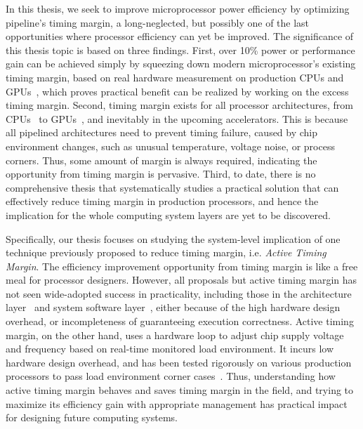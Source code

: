 In this thesis, we seek to improve microprocessor power efficiency by optimizing pipeline's timing margin, a long-neglected, but possibly one of the last opportunities where processor efficiency can yet be improved. The significance of this thesis topic is based on three findings. First, over 10\% power or performance gain can be achieved simply by squeezing down modern microprocessor's existing timing margin, based on real hardware measurement on production CPUs and GPUs~\cite{reddi2010voltage, leng2015safe}, which proves practical benefit can be realized by working on the excess timing margin. Second, timing margin exists for all processor architectures, from CPUs~\cite{reddi2009voltage,reddi2010voltage} to GPUs~\cite{leng2014gpuvolt, leng2015gpu, leng2015safe}, and inevitably in the upcoming accelerators. This is because all pipelined architectures need to prevent timing failure, caused by chip environment changes, such as unusual temperature, voltage noise, or process corners. Thus, some amount of margin is always required, indicating the opportunity from timing margin is pervasive. Third, to date, there is no comprehensive thesis that systematically studies a practical solution that can effectively reduce timing margin in production processors, and hence the implication for the whole computing system layers are yet to be discovered.

Specifically, our thesis focuses on studying the system-level implication of one technique previously proposed to reduce timing margin, i.e. \textit{Active Timing Margin}. The efficiency improvement opportunity from timing margin is like a free meal for processor designers. However, all proposals but active timing margin has not seen wide-adopted success in practicality, including those in the architecture layer~\cite{grochowski2002microarchitectural,ernst2003razor,powell2003pipeline,gupta2008decor,gupta2009event, reddi2009voltage} and system software layer~\cite{reddi2010voltage,miller2012vrsync,leng2015safe, papadimitriou2017harnessing}, either because of the high hardware design overhead, or incompleteness of guaranteeing execution correctness. Active timing margin, on the other hand, uses a hardware loop to adjust chip supply voltage and frequency based on real-time monitored load environment. It incurs low hardware design overhead, and has been tested rigorously on various production processors to pass load environment corner cases~\cite{lefurgy2011active,bowman201222nm,tokunaga20145,grenat20145,bowman20158,webel2015robust,vezyrtzis2018droop,fischer200590nm}. Thus, understanding how active timing margin behaves and saves timing margin in the field, and trying to maximize its efficiency gain with appropriate management has practical impact for designing future computing systems.

